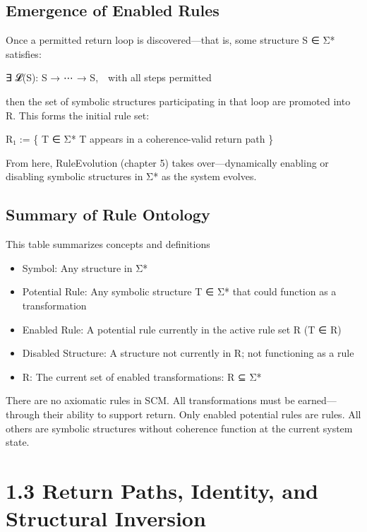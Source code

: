 \subsection{Emergence of Enabled
Rules}\label{emergence-of-enabled-rules}

Once a permitted return loop is discovered---that is, some structure S ∈
Σ* satisfies:

∃ 𝓛(S): S → ⋯ → S, with all steps permitted

then the set of symbolic structures participating in that loop are
promoted into R. This forms the initial rule set:

R₁ := \{ T ∈ Σ* \textbar{} T appears in a coherence-valid return path \}

From here, RuleEvolution (chapter 5) takes over---dynamically enabling
or disabling symbolic structures in Σ* as the system evolves.

\subsection{Summary of Rule Ontology}\label{summary-of-rule-ontology}

This table summarizes concepts and definitions

\begin{itemize}
\item
  Symbol: Any structure in Σ*
\item
  Potential Rule: Any symbolic structure T ∈ Σ* that could function as a
  transformation
\item
  Enabled Rule: A potential rule currently in the active rule set R (T ∈
  R)
\item
  Disabled Structure: A structure not currently in R; not functioning as
  a rule
\item
  R: The current set of enabled transformations: R ⊆ Σ*
\end{itemize}

There are no axiomatic rules in SCM. All transformations must be
earned---through their ability to support return. Only enabled potential
rules are rules. All others are symbolic structures without coherence
function at the current system state.

\section{1.3 \textbar{} Return Paths, Identity, and Structural
Inversion}\label{return-paths-identity-and-structural-inversion}

